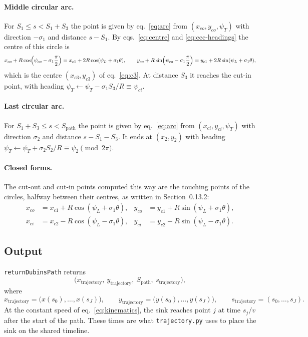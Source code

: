 \documentclass[10pt]{article}
\newcommand{\code}[1]{\texttt{#1}}
\newcommand{\Spath}{S_{\mathrm{path}}}
\newcommand{\xtraj}{x_{\mathrm{trajectory}}}
\newcommand{\ytraj}{y_{\mathrm{trajectory}}}
\newcommand{\straj}{s_{\mathrm{trajectory}}}
\begin{document}
\paragraph{Middle circular arc.} For $S_1 \le s < S_1 + S_3$ the point is given by eq.~\eqref{eq:arc} from
$(x_{co}, y_{co}, \psi_T)$ with direction $-\sigma_1$ and distance $s - S_1$. By eqs.~\eqref{eq:centre} and
\eqref{eq:ccc-headings} the centre of this circle is
\[
  x_{co} + R\cos\Bigl(\psi_{co} - \sigma_1\frac{\pi}{2}\Bigr) = x_{c1} + 2R\cos(\psi_L + \sigma_1\theta), \qquad
  y_{co} + R\sin\Bigl(\psi_{co} - \sigma_1\frac{\pi}{2}\Bigr) = y_{c1} + 2R\sin(\psi_L + \sigma_1\theta),
\]
which is the centre $(x_{c3}, y_{c3})$ of eq.~\eqref{eq:c3}. At distance $S_3$ it reaches the cut-in point, with
heading $\psi_T \leftarrow \psi_T - \sigma_1 S_3 / R \equiv \psi_{ci}$.

\paragraph{Last circular arc.} For $S_1 + S_3 \le s < \Spath$ the point is given by eq.~\eqref{eq:arc} from
$(x_{ci}, y_{ci}, \psi_T)$ with direction $\sigma_2$ and distance $s - S_1 - S_3$. It ends at $(x_2, y_2)$ with heading
$\psi_T \leftarrow \psi_T + \sigma_2 S_2 / R \equiv \psi_2 \pmod{2\pi}$.

\paragraph{Closed forms.} The cut-out and cut-in points computed this way are the touching points of the circles,
halfway between their centres, as written in Section~0.13.2:
\begin{equation}
  \begin{aligned}
  x_{co} &= x_{c1} + R\cos(\psi_L + \sigma_1\theta), & y_{co} &= y_{c1} + R\sin(\psi_L + \sigma_1\theta),\\
  x_{ci} &= x_{c2} - R\cos(\psi_L - \sigma_1\theta), & y_{ci} &= y_{c2} - R\sin(\psi_L - \sigma_1\theta).
  \end{aligned}
  \label{eq:ccc-points}
\end{equation}

\subsection{Output}

\code{returnDubinsPath} returns
\begin{equation}
  \bigl(\xtraj,\ \ytraj,\ \Spath,\ \straj\bigr),
  \label{eq:output}
\end{equation}
where
\[
  \xtraj = \bigl(x(s_0), \ldots, x(s_J)\bigr), \qquad
  \ytraj = \bigl(y(s_0), \ldots, y(s_J)\bigr), \qquad
  \straj = (s_0, \ldots, s_J).
\]
At the constant speed of eq.~\eqref{eq:kinematics}, the sink reaches point $j$ at time $s_j / v$ after the start of
the path. These times are what \code{trajectory.py} uses to place the sink on the shared timeline.
\end{document}
